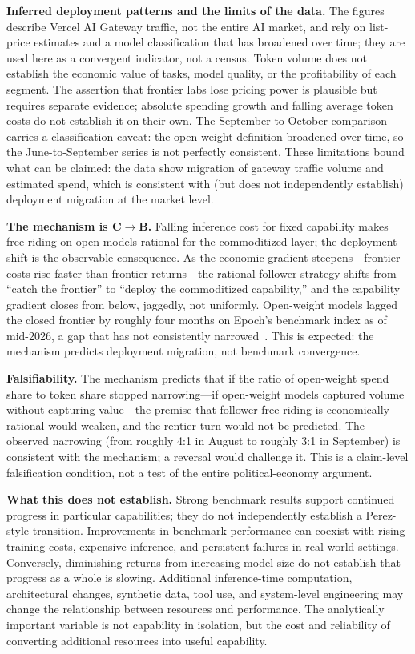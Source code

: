\textbf{Inferred deployment patterns and the limits of the data.} The figures describe Vercel AI Gateway traffic, not the entire AI market, and rely on list-price estimates and a model classification that has broadened over time; they are used here as a convergent indicator, not a census. Token volume does not establish the economic value of tasks, model quality, or the profitability of each segment. The assertion that frontier labs lose pricing power is plausible but requires separate evidence; absolute spending growth and falling average token costs do not establish it on their own. The September-to-October comparison carries a classification caveat: the open-weight definition broadened over time, so the June-to-September series is not perfectly consistent. These limitations bound what can be claimed: the data show migration of gateway traffic volume and estimated spend, which is consistent with (but does not independently establish) deployment migration at the market level.

\textbf{The mechanism is C$\rightarrow$B.} Falling inference cost for fixed capability makes free-riding on open models rational for the commoditized layer; the deployment shift is the observable consequence. As the economic gradient steepens---frontier costs rise faster than frontier returns---the rational follower strategy shifts from ``catch the frontier'' to ``deploy the commoditized capability,'' and the capability gradient closes from below, jaggedly, not uniformly. Open-weight models lagged the closed frontier by roughly four months on Epoch's benchmark index as of mid-2026, a gap that has not consistently narrowed~\cite{epochai2026}. This is expected: the mechanism predicts deployment migration, not benchmark convergence.

\textbf{Falsifiability.} The mechanism predicts that if the ratio of open-weight spend share to token share stopped narrowing---if open-weight models captured volume without capturing value---the premise that follower free-riding is economically rational would weaken, and the rentier turn would not be predicted. The observed narrowing (from roughly 4:1 in August to roughly 3:1 in September) is consistent with the mechanism; a reversal would challenge it. This is a claim-level falsification condition, not a test of the entire political-economy argument.

\textbf{What this does not establish.} Strong benchmark results support continued progress in particular capabilities; they do not independently establish a Perez-style transition. Improvements in benchmark performance can coexist with rising training costs, expensive inference, and persistent failures in real-world settings. Conversely, diminishing returns from increasing model size do not establish that progress as a whole is slowing. Additional inference-time computation, architectural changes, synthetic data, tool use, and system-level engineering may change the relationship between resources and performance. The analytically important variable is not capability in isolation, but the cost and reliability of converting additional resources into useful capability.
